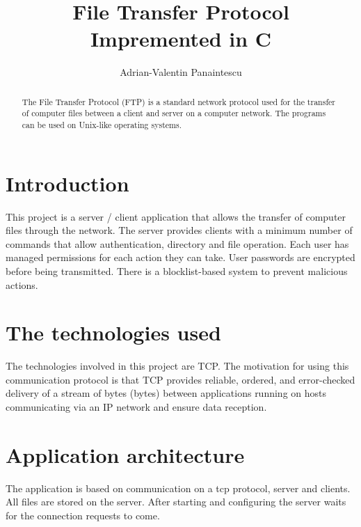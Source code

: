 \documentclass[runningheads]{llncs}
\begin{document}
\title{File Transfer Protocol Impremented in C}

\author{
    Adrian-Valentin Panaintescu
    }


\maketitle

\begin{abstract}
    The File Transfer Protocol (FTP) is a standard network protocol used for the transfer of computer files between a client and server on a computer network. The programs can be used on Unix-like operating systems.
\end{abstract}

\section{Introduction}
    This project is a server / client application that allows the transfer of computer files through the network. The server provides clients with a minimum number of commands that allow authentication, directory and file operation. Each user has managed permissions for each action they can take. User passwords are encrypted before being transmitted. There is a blocklist-based system to prevent malicious actions.
\section{The technologies used}
    The technologies involved in this project are TCP. The motivation for using this communication protocol is that TCP provides reliable, ordered, and error-checked delivery of a stream of bytes (bytes) between applications running on hosts communicating via an IP network and ensure data reception. \cite{w:tcp}

\section{Application architecture}
    The application is based on communication on a tcp protocol, server and clients. All files are stored on the server. After starting and configuring the server waits for the connection requests to come.
\end{document}
